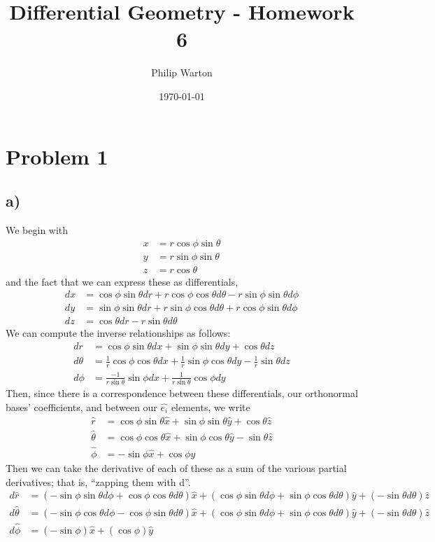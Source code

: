 \documentclass{article}
\theoremstyle{definition}
\begin{document}
\title{Differential Geometry - Homework 6}
\author{Philip Warton}
\date{\today}
\maketitle
\section*{Problem 1}
\subsection*{a)}
We begin with
\begin{align}
    x &= r\cos\phi\sin\theta \\
    y &= r\sin\phi\sin\theta \\
    z &= r\cos\theta
\end{align}
and the fact that we can express these as differentials,
\begin{align}
    dx &= \cos\phi\sin\theta dr + r\cos\phi\cos\theta d\theta - r\sin\phi\sin\theta d\phi\\
    dy &= \sin\phi\sin\theta dr + r\sin\phi\cos\theta d\theta + r\cos\phi\sin\theta d\phi\\
    dz &= \cos\theta dr - r\sin\theta d\theta
\end{align}
We can compute the inverse relationships as follows:
\begin{align}
    dr &= \cos\phi\sin\theta dx + \sin\phi\sin\theta dy + \cos\theta dz\\
    d\theta &= \frac{1}{r}\cos\phi\cos\theta dx + \frac{1}{r}\sin\phi\cos\theta dy - \frac{1}{r}\sin\theta dz\\
    d\phi &= \frac{-1}{r\sin\theta}\sin\phi dx + \frac{1}{r\sin\theta}\cos\phi dy
\end{align}
Then, since there is a correspondence between these differentials, our orthonormal bases' coefficients, and between our $\hat{e_i}$ elements,
we write
\begin{align}
    \hat{r} &= \cos\phi\sin\theta\hat{x} + \sin\phi\sin\theta\hat{y} + \cos\theta\hat{z}\\
    \hat{\theta} &= \cos\phi\cos\theta \hat{x} + \sin\phi\cos\theta \hat{y} - \sin\theta \hat{z}\\
    \hat{\phi} &= -\sin\phi \hat{x} + \cos\phi \hat{y}
\end{align}
Then we can take the derivative of each of these as a sum of the various partial derivatives;
that is, ``zapping them with d''.
\begin{align}
    d\hat{r} &= (-\sin\phi\sin\theta d\phi + \cos\phi\cos\theta d\theta)\hat{x} + (\cos\phi\sin\theta d\phi + \sin\phi\cos\theta d\theta)\hat{y} + (-\sin\theta d\theta)\hat{z}\\
    d\hat{\theta} &= (-\sin\phi\cos\theta d\phi - \cos\phi\sin\theta d\theta)\hat{x} + (\cos\phi\sin\theta d\phi + \sin\phi\cos\theta d\theta)\hat{y} + (-\sin\theta d\theta)\hat{z}\\
    d\hat{\phi} &= (-\sin\phi)\hat{x} + (\cos\phi)\hat{y}
\end{align}
\end{document}
